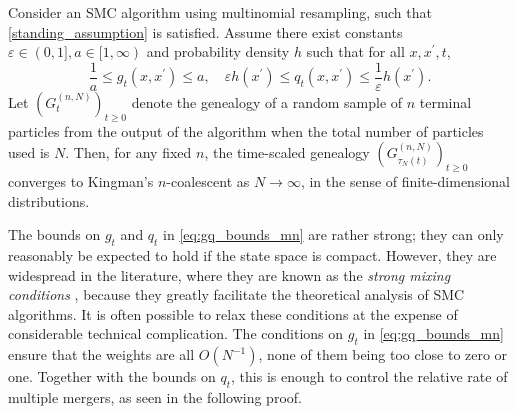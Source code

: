 \begin{corollary}\label{thm:multinomial}
Consider an SMC algorithm using multinomial resampling, such that \ref{standing_assumption} is satisfied. Assume there exist constants $\varepsilon\in (0,1], a\in [1,\infty)$ and probability density $h$ such that for all $x, x^\prime, t$,
\begin{equation}\label{eq:gq_bounds_mn}
\frac{1}{a} \leq g_t(x, x^\prime) \leq a , \quad
\varepsilon h(x^\prime) \leq q_t(x, x^\prime) \leq \frac{1}{\varepsilon} h(x^\prime) .
\end{equation}
Let $(G_t^{(n,N)})_{t\geq0}$ denote the genealogy of a random sample of $n$ terminal particles from the output of the algorithm when the total number of particles used is $N$. Then, for any fixed $n$, the time-scaled genealogy $(G_{\tau_N(t)}^{(n,N)})_{t\geq0}$ converges to Kingman's $n$-coalescent as $N\to \infty$, in the sense of finite-dimensional distributions.
\end{corollary}
The bounds on $g_t$ and $q_t$ in \eqref{eq:gq_bounds_mn} are rather strong; they can only reasonably be expected to hold if the state space is compact. 
However, they are widespread in the literature, where they are known as the \emph{strong mixing conditions} \parencite[Section 3.5.2]{delmoral2004}, because they greatly facilitate the theoretical analysis of SMC algorithms. It is often possible to relax these conditions at the expense of considerable technical complication.
The conditions on $g_t$ in \eqref{eq:gq_bounds_mn} ensure that the weights are all $O(N^{-1})$, none of them being too close to zero or one. Together with the bounds on $q_t$, this is enough to control the relative rate of multiple mergers, as seen in the following proof.

